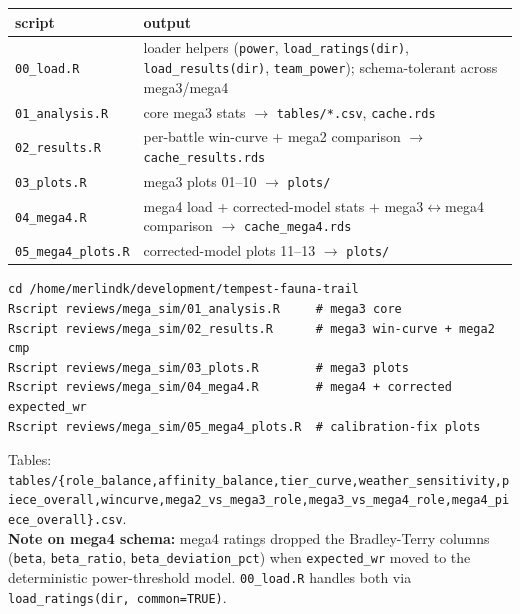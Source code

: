 \documentclass[10pt]{article}
\begin{document}
\medskip
\begin{tabularx}{\linewidth}{LL}
\toprule
\textbf{script} & \textbf{output} \\
\midrule
\texttt{00\_\allowbreak{}load.\allowbreak{}R} & loader helpers (\texttt{power}, \texttt{load\_\allowbreak{}ratings(\allowbreak{}dir)\allowbreak{}}, \texttt{load\_\allowbreak{}results(\allowbreak{}dir)\allowbreak{}}, \texttt{team\_\allowbreak{}power}); schema-tolerant across mega3/mega4 \\
\texttt{01\_\allowbreak{}analysis.\allowbreak{}R} & core mega3 stats $\rightarrow$ \texttt{tables/\allowbreak{}*.\allowbreak{}csv}, \texttt{cache.\allowbreak{}rds} \\
\texttt{02\_\allowbreak{}results.\allowbreak{}R} & per-battle win-curve + mega2 comparison $\rightarrow$ \texttt{cache\_\allowbreak{}results.\allowbreak{}rds} \\
\texttt{03\_\allowbreak{}plots.\allowbreak{}R} & mega3 plots 01--10 $\rightarrow$ \texttt{plots/\allowbreak{}} \\
\texttt{04\_\allowbreak{}mega4.\allowbreak{}R} & mega4 load + corrected-model stats + mega3$\leftrightarrow$mega4 comparison $\rightarrow$ \texttt{cache\_\allowbreak{}mega4.\allowbreak{}rds} \\
\texttt{05\_\allowbreak{}mega4\_\allowbreak{}plots.\allowbreak{}R} & corrected-model plots 11--13 $\rightarrow$ \texttt{plots/\allowbreak{}} \\
\bottomrule
\end{tabularx}
\medskip

\begin{lstlisting}
cd /home/merlindk/development/tempest-fauna-trail
Rscript reviews/mega_sim/01_analysis.R     # mega3 core
Rscript reviews/mega_sim/02_results.R      # mega3 win-curve + mega2 cmp
Rscript reviews/mega_sim/03_plots.R        # mega3 plots
Rscript reviews/mega_sim/04_mega4.R        # mega4 + corrected expected_wr
Rscript reviews/mega_sim/05_mega4_plots.R  # calibration-fix plots
\end{lstlisting}

Tables: \texttt{tables/\allowbreak{}\{\allowbreak{}role\_\allowbreak{}balance,\allowbreak{}affinity\_\allowbreak{}balance,\allowbreak{}tier\_\allowbreak{}curve,\allowbreak{}weather\_\allowbreak{}sensitivity,\allowbreak{}piece\_\allowbreak{}overall,\allowbreak{}wincurve,\allowbreak{}mega2\_\allowbreak{}vs\_\allowbreak{}mega3\_\allowbreak{}role,\allowbreak{}mega3\_\allowbreak{}vs\_\allowbreak{}mega4\_\allowbreak{}role,\allowbreak{}mega4\_\allowbreak{}piece\_\allowbreak{}overall\}\allowbreak{}.\allowbreak{}csv}.\\

\textbf{Note on mega4 schema:} mega4 ratings dropped the Bradley-Terry columns (\texttt{beta}, \texttt{beta\_\allowbreak{}ratio}, \texttt{beta\_\allowbreak{}deviation\_\allowbreak{}pct}) when \texttt{expected\_\allowbreak{}wr} moved to the deterministic power-threshold model. \texttt{00\_\allowbreak{}load.\allowbreak{}R} handles both via \texttt{load\_\allowbreak{}ratings(\allowbreak{}dir,\allowbreak{} common=TRUE)\allowbreak{}}.\\
\end{document}

